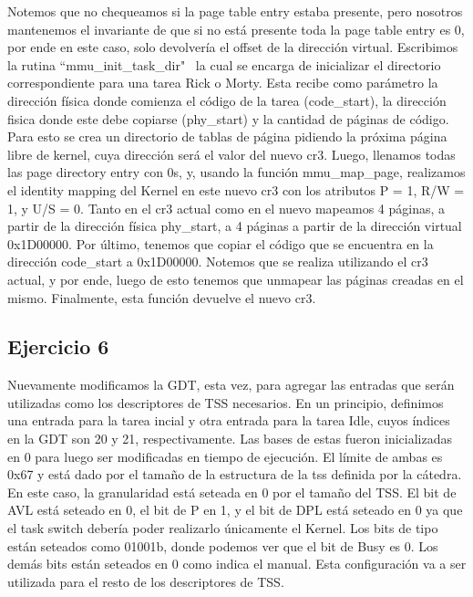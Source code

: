 \documentclass[a4paper]{article}
\begin{document}
\justify
Notemos que no chequeamos si la page table entry estaba presente, pero nosotros mantenemos el invariante de que si no está presente toda la page table entry es 0, por ende en este caso, solo devolvería el offset de la dirección virtual.
\justify
Escribimos la rutina ``mmu_init_task_dir" \, la cual se encarga de inicializar el directorio correspondiente para una tarea Rick o Morty. Esta recibe como parámetro la dirección física donde comienza el código de la tarea (code_start), la dirección fisica donde este debe copiarse (phy_start) y la cantidad de páginas de código.
Para esto se crea un directorio de tablas de página pidiendo la próxima página libre de kernel, cuya dirección será el valor del nuevo cr3. Luego, llenamos todas las page directory entry con 0s, y, usando la función mmu_map_page, realizamos el identity mapping del Kernel en este nuevo cr3 con los atributos P = 1, R/W = 1, y U/S = 0. Tanto en el cr3 actual como en el nuevo mapeamos 4 páginas, a partir de la dirección física phy_start, a 4 páginas a partir de la dirección virtual 0x1D00000. Por último, tenemos que copiar el código que se encuentra en la dirección code_start a 0x1D00000. Notemos que se realiza utilizando el cr3 actual, y por ende, luego de esto tenemos que unmapear las páginas creadas en el mismo. Finalmente, esta función devuelve el nuevo cr3.
 

\subsection{Ejercicio 6}

\justify
Nuevamente modificamos la GDT, esta vez, para agregar las entradas que serán utilizadas como los descriptores de TSS necesarios. En un principio, definimos una entrada para la tarea incial y otra entrada para la tarea Idle, cuyos índices en la GDT son 20 y 21, respectivamente. Las bases de estas fueron inicializadas en 0 para luego ser modificadas en tiempo de ejecución. El límite de ambas es 0x67 y está dado por el tamaño de la estructura de la tss definida por la cátedra. En este caso, la granularidad está seteada en 0 por el tamaño del TSS. El bit de AVL está seteado en 0, el bit de P en 1, y el bit de DPL está seteado en 0 ya que el task switch debería poder realizarlo únicamente el Kernel. Los bits de tipo están seteados como 01001b, donde podemos ver que el bit de Busy es 0. Los demás bits están seteados en 0 como indica el manual. Esta configuración va a ser utilizada para el resto de los descriptores de TSS.
\end{document}
